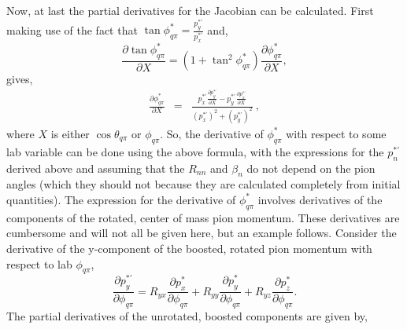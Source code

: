 Now, at last the partial derivatives for the Jacobian can be
calculated.  First making use of the fact that 
$\tan{\phi_{q\pi}^*}=\frac{p_y^{*'}}{p_x^{*'}}$ and,
\begin{equation}
\frac{\partial{\tan{\phi^*_{q\pi}}}}{\partial{X}} = 
(1+\tan^2{\phi^*_{q\pi}})\frac{\partial{\phi^*_{q\pi}}}{\partial{X}},
\end{equation}
gives,
\begin{eqnarray}
\frac{\partial{\phi^*_{q\pi}}}{\partial{X}}  & = & 
\frac{p_x^{*'} \frac{\partial{p_y^{*'}}}{\partial{X}} - 
      p_y^{*'} \frac{\partial{p_x^{*'}}}{\partial{X}} }{(p_x^{*'})^2 + 
 (p_y^{*'})^2} \:,
\end{eqnarray}
where $X$ is either $\cos{\theta_{q\pi}}$ or $\phi_{q\pi}$.
So, the derivative of $\phi^*_{q\pi}$ with respect to some lab variable can
be done using the above formula, with the expressions for the $p_n^{*'}$ 
derived above and assuming that the $R_{nn}$ and $\beta_n$ do not depend on
the pion angles (which they should not because they are calculated completely
from initial quantities).  The expression for the derivative of 
$\phi^*_{q\pi}$ involves derivatives of the components of the rotated, 
center of mass pion momentum.  These derivatives are cumbersome and will not 
all be given here, but an example follows.  Consider the derivative of
the y-component of the boosted, rotated pion momentum with respect to lab
$\phi_{q\pi}$,   
\begin{equation}
\frac{ \partial{p_y^{*'}}}{\partial{\phi_{q\pi}}} = 
R_{yx}\frac{\partial{p_x^*}}{\partial{\phi_{q\pi}}} + 
R_{yy}\frac{\partial{p_y^*}}{\partial{\phi_{q\pi}}} +
R_{yz}\frac{\partial{p_z^*}}{\partial{\phi_{q\pi}}}.
\end{equation}
The partial derivatives of the unrotated, boosted components are given by,
